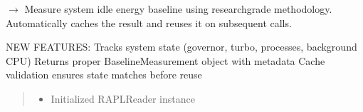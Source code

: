 \documentclass[letterpaper,10pt,english]{sphinxmanual}
\begin{document}
\begin{fulllineitems}
\label{\detokenize{core.utils.idle_baseline:core.utils.idle_baseline.measure_idle_baseline}}
\pysigstartsignatures
\pysiglinewithargsret
{}
{\sphinxparamcomma {}\sphinxparamcomma {}\sphinxparamcomma {}\sphinxparamcomma {}\sphinxparamcomma {}\sphinxparamcomma {}\sphinxparamcomma {}}
{{ $\rightarrow$ {\hyperref[\detokenize{core.models.baseline_measurement:core.models.baseline_measurement.BaselineMeasurement}]{}}}}
\pysigstopsignatures
\sphinxAtStartPar
Measure system idle energy baseline using research\sphinxhyphen{}grade methodology.
Automatically caches the result and reuses it on subsequent calls.

\sphinxAtStartPar
NEW FEATURES:
\sphinxhyphen{} Tracks system state (governor, turbo, processes, background CPU)
\sphinxhyphen{} Returns proper BaselineMeasurement object with metadata
\sphinxhyphen{} Cache validation ensures state matches before reuse
\begin{quote}\begin{description}
\begin{itemize}
\item {} 
\sphinxAtStartPar
{} \textendash{} Initialized RAPLReader instance


\end{itemize}
\end{description}
\end{quote}
\end{fulllineitems}
\end{document}
